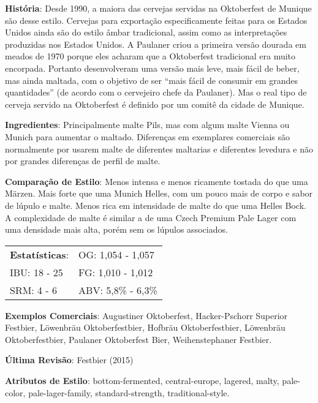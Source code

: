 \textbf{História}: Desde 1990, a maiora das cervejas servidas na Oktoberfest de Munique são desse estilo. Cervejas para exportação especificamente feitas para os Estados Unidos ainda são do estilo âmbar tradicional, assim como as interpretações produzidas nos Estados Unidos. A Paulaner criou a primeira versão dourada em meados de 1970 porque eles acharam que a Oktoberfest tradicional era muito encorpada. Portanto desenvolveram uma versão mais leve, mais fácil de beber, mas ainda maltada, com o objetivo de ser “mais fácil de consumir em grandes quantidades” (de acordo com o cervejeiro chefe da Paulaner). Mas o real tipo de cerveja servido na Oktoberfest é definido por um comitê da cidade de Munique.

\textbf{Ingredientes}: Principalmente malte Pils, mas com algum malte Vienna ou Munich para aumentar o maltado. Diferenças em exemplares comerciais são normalmente por usarem malte de diferentes maltarias e diferentes levedura e não por grandes diferenças de perfil de malte.

\textbf{Comparação de Estilo}: Menos intensa e menos ricamente tostada do que uma Märzen. Mais forte que uma Munich Helles, com um pouco mais de corpo e sabor de lúpulo e malte. Menos rica em intensidade de malte do que uma Helles Bock. A complexidade de malte é similar a de uma Czech Premium Pale Lager com uma densidade mais alta, porém sem os lúpulos associados.

\begin{tabular}{@{}p{35mm}p{35mm}@{}}
  \textbf{Estatísticas}: & OG: 1,054 - 1,057 \\
  IBU: 18 - 25  & FG: 1,010 - 1,012  \\
  SRM: 4 - 6   & ABV: 5,8\% - 6,3\%
\end{tabular}

\textbf{Exemplos Comerciais}: Augustiner Oktoberfest, Hacker-Pschorr Superior Festbier, Löwenbräu Oktoberfestbier, Hofbräu Oktoberfestbier, Löwenbräu Oktoberfestbier, Paulaner Oktoberfest Bier, Weihenstephaner Festbier.

\textbf{Última Revisão}: Festbier (2015)

\textbf{Atributos de Estilo}: bottom-fermented, central-europe, lagered, malty, pale-color, pale-lager-family, standard-strength, traditional-style.